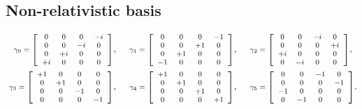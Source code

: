 \subsection{Non-relativistic basis}

\begin{equation}
\begin{gathered}
\mbox{ \footnotesize$
\gamma_0=
\left[
\begin{array}{cccc}
0 & 0 & 0 & -i \\
0 & 0 & -i & 0 \\
0 & +i & 0 & 0 \\
+i & 0 & 0 & 0 \\
\end{array}\right]
$\normalsize }, \quad
\mbox{ \footnotesize$
\gamma_1=
\left[
\begin{array}{cccc}
0 & 0 & 0 & -1 \\
0 & 0 & +1 & 0 \\
0 & +1 & 0 & 0 \\
-1 & 0 & 0 & 0 \\
\end{array}\right]
$\normalsize }, \quad
\mbox{ \footnotesize$
\gamma_2=
\left[
\begin{array}{cccc}
0 & 0 & -i & 0 \\
0 & 0 & 0 & +i \\
+i & 0 & 0 & 0 \\
0 & -i & 0 & 0 \\
\end{array}\right]
$\normalsize }, \\
\mbox{ \footnotesize$
\gamma_3=
\left[
\begin{array}{cccc}
+1 & 0 & 0 & 0 \\
0 & +1 & 0 & 0 \\
0 & 0 & -1 & 0 \\
0 & 0 & 0 & -1 \\
\end{array}\right]
$\normalsize }, \quad
\mbox{ \footnotesize$
\gamma_4=
\left[
\begin{array}{cccc}
+1 & 0 & 0 & 0 \\
0 & +1 & 0 & 0 \\
0 & 0 & +1 & 0 \\
0 & 0 & 0 & +1 \\
\end{array}\right]
$\normalsize }, \quad
\mbox{ \footnotesize$
\gamma_5=
\left[
\begin{array}{cccc}
0 & 0 & -1 & 0 \\
0 & 0 & 0 & -1 \\
-1 & 0 & 0 & 0 \\
0 & -1 & 0 & 0 \\
\end{array}\right]
$\normalsize }. \\
\end{gathered}
\end{equation}


